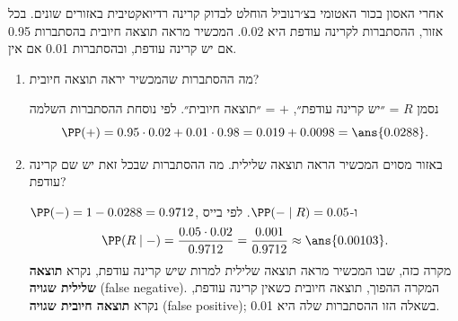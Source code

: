 אחרי האסון בכור האטומי בצ׳רנוביל הוחלט לבדוק קרינה רדיואקטיבית באזורים שונים. בכל אזור, ההסתברות לקרינה עודפת היא 0.02. המכשיר מראה תוצאה חיובית בהסתברות 0.95 אם יש קרינה עודפת, ובהסתברות 0.01 אם אין.
\begin{enumerate}
\item מה ההסתברות שהמכשיר יראה תוצאה חיובית?
\begin{solbox}
נסמן $R$ = ״יש קרינה עודפת״, $+$ = ״תוצאה חיובית״. לפי נוסחת ההסתברות השלמה
\[
\PP(+)=0.95\cdot0.02+0.01\cdot0.98=0.019+0.0098=\ans{0.0288}.
\]
\end{solbox}
\item באזור מסוים המכשיר הראה תוצאה שלילית. מה ההסתברות שבכל זאת יש שם קרינה עודפת?
\begin{solbox}
$\PP(-)=1-0.0288=0.9712$, ו-$\PP(-\mid R)=0.05$. לפי בייס
\[
\PP(R\mid -)=\frac{0.05\cdot0.02}{0.9712}=\frac{0.001}{0.9712}\approx\ans{0.00103}.
\]
מקרה כזה, שבו המכשיר מראה תוצאה שלילית למרות שיש קרינה עודפת, נקרא \textbf{תוצאה שלילית שגויה} (\textenglish{false negative}). המקרה ההפוך, תוצאה חיובית כשאין קרינה עודפת, נקרא \textbf{תוצאה חיובית שגויה} (\textenglish{false positive}); בשאלה הזו ההסתברות שלה היא 0.01.
\end{solbox}
\end{enumerate}
